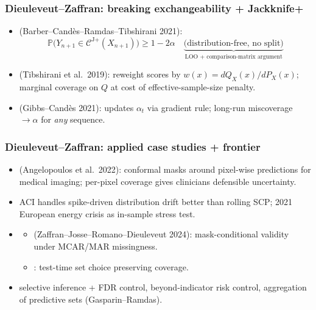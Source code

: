 \documentclass[11pt, aspectratio=169, xcolor={dvipsnames}, usepdftitle=false]{beamer}
\begin{document}
\begin{frame}
\frametitle{Dieuleveut--Zaffran: breaking exchangeability + Jackknife+}
\begin{itemize}
\item {} (Barber--Cand\`es--Ramdas--Tibshirani 2021):
\begin{equation*}
\mathbb{P}\bigl(Y_{n+1} \in \mathcal{C}^{\text{J+}}(X_{n+1})\bigr) \geq 1 - 2\alpha
\quad
\underbrace{\text{(distribution-free, no split)}}_{\text{LOO + comparison-matrix argument}}
\end{equation*}
\item {} (Tibshirani et al.\ 2019): reweight scores by $w(x) = dQ_X(x)/dP_X(x)$; marginal coverage on $Q$ at cost of effective-sample-size penalty.
\item {} (Gibbs--Cand\`es 2021):  updates $\alpha_t$ via gradient rule; long-run miscoverage $\to \alpha$ for \emph{any} sequence.
\end{itemize}
\end{frame}

\begin{frame}
\frametitle{Dieuleveut--Zaffran: applied case studies + frontier}
\begin{itemize}
\item {} (Angelopoulos et al.\ 2022): conformal masks around pixel-wise predictions for medical imaging; per-pixel coverage gives clinicians defensible uncertainty.
\item {} ACI handles spike-driven distribution drift better than rolling SCP; 2021 European energy crisis as in-sample stress test.
\item {}
\begin{itemize}
\item {} (Zaffran--Josse--Romano--Dieuleveut 2024): mask-conditional validity under MCAR/MAR missingness.
\item {}: test-time set choice preserving coverage.
\end{itemize}
\item {} selective inference + FDR control, beyond-indicator risk control, aggregation of predictive sets (Gasparin--Ramdas).
\end{itemize}
\end{frame}
\end{document}
